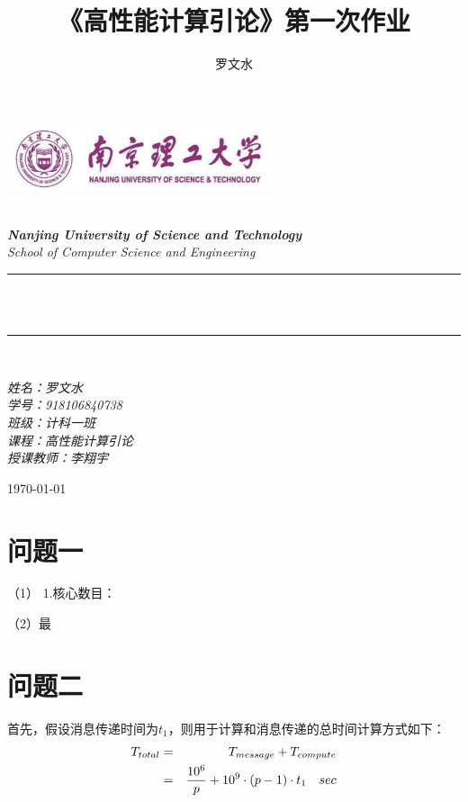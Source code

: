 \documentclass[12pt]{article}
\title{《高性能计算引论》第一次作业}
\author{\textup{罗文水}}
\begin{document}
	
	\begin{titlepage}
		\newcommand{\HRule}{\rule{\linewidth}{0.5mm}}
		\begin{center}
			\includegraphics[width=8cm]{title}			
		\end{center}
		
		\center 
		\quad\\[1.5cm]
		\textsl{\Large \textbf{Nanjing University of Science and Technology} }\\[0.5cm] 
		\textsl{\large School of Computer Science and Engineering}\\[0.5cm] 
		\makeatletter
		\HRule \\[0.4cm]
		{ \huge \bfseries \@title}\\[0.25cm] 
		\HRule \\[1.5cm]
	\begin{minipage}{0.42\textwidth}
		\begin{flushleft}
			
			\Large{\emph{姓名：罗文水}}
			\\
			\Large{\emph{学号：918106840738}}
			\\
			\Large{\emph{班级：计科一班}}
			\\
			\Large{\emph{课程：高性能计算引论}}
			\\
			\Large{\emph{授课教师：李翔宇}}
			\\
		\end{flushleft}
	\end{minipage}
		\vspace{7em} 
		
		{\large \today}\\[2cm] 
		\vfill 
	\end{titlepage}
	
	\newpage
\section{问题一}
	（1） 1.核心数目：

	（2）最
	
\section{问题二}

	首先，假设消息传递时间为$t_1$，则用于计算和消息传递的总时间计算方式如下：
\begin{eqnarray}\label{px}
	T_{total}&=&T_{message}+T_{compute}\\ \notag
	&=&
	\frac{10^{6}}{p}+10^{9}\cdot(p-1)\cdot t_1 \quad sec
\end{eqnarray}
\end{document}

